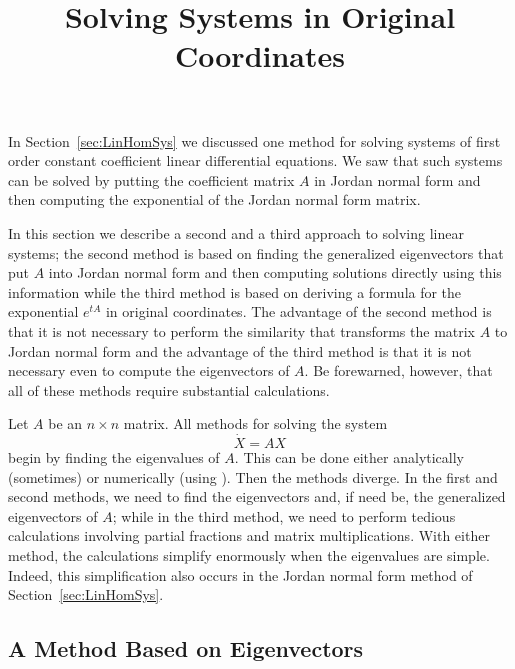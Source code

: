 \documentclass{ximera}
\title{Solving Systems in Original Coordinates}
\begin{document}
\begin{abstract}
\end{abstract}
\maketitle


\label{S:SEOC}

In Section~\ref{sec:LinHomSys} we discussed one method for solving systems of 
first order constant coefficient linear differential equations.   We saw that 
such systems can be solved by putting the coefficient matrix $A$ in Jordan 
normal form and then computing the exponential of the Jordan normal form 
matrix.  

In this section we describe a second and a third approach to solving linear 
systems; the second method is based on finding the generalized eigenvectors 
that put $A$ into Jordan normal form and then
computing solutions directly using this information while the third method is 
based on deriving a formula for the exponential 
$e^{tA}$ in original coordinates.  The advantage of the second method is
that it is not necessary to perform the similarity that transforms the matrix 
$A$ to Jordan normal form and the advantage of the third method is that it is 
not necessary even to compute the eigenvectors of $A$.  Be forewarned,
however, that all of these methods require substantial calculations.

Let $A$ be an $n\times n$ matrix.  All methods for solving the system 
\begin{equation} \label{dotX=AX}
\dot{X}=AX
\end{equation}
begin by finding the eigenvalues of $A$.  This can be done 
either analytically (sometimes) or numerically (using \Matlabp). Then the  
methods diverge.  In the first and second methods, we need to find the 
eigenvectors and, if need be, the generalized eigenvectors
 of $A$; while in the third method, we need to 
perform tedious calculations involving partial fractions and matrix 
multiplications.  With either method, the calculations simplify enormously 
when the eigenvalues are simple.  Indeed, this simplification also occurs in 
the Jordan normal form method of Section~\ref{sec:LinHomSys}.

\subsection*{A Method Based on Eigenvectors}
 
\end{document}
